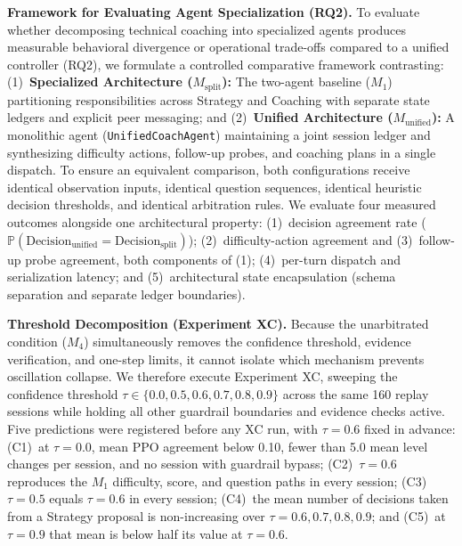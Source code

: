 \noindent\textbf{Framework for Evaluating Agent Specialization (RQ2).}
To evaluate whether decomposing technical coaching into specialized agents produces measurable behavioral divergence or operational trade-offs compared to a unified controller (RQ2), we formulate a controlled comparative framework contrasting: (1)~\textbf{Specialized Architecture ($M_{\text{split}}$):} The two-agent baseline ($M_1$) partitioning responsibilities across Strategy and Coaching with separate state ledgers and explicit peer messaging; and (2)~\textbf{Unified Architecture ($M_{\text{unified}}$):} A monolithic agent (\texttt{UnifiedCoachAgent}) maintaining a joint session ledger and synthesizing difficulty actions, follow-up probes, and coaching plans in a single dispatch. To ensure an equivalent comparison, both configurations receive identical observation inputs, identical question sequences, identical heuristic decision thresholds, and identical arbitration rules. We evaluate four measured outcomes alongside one architectural property: (1)~decision agreement rate ($\mathbb{P}(\text{Decision}_{\text{unified}} = \text{Decision}_{\text{split}})$); (2)~difficulty-action agreement and (3)~follow-up probe agreement, both components of (1); (4)~per-turn dispatch and serialization latency; and (5)~architectural state encapsulation (schema separation and separate ledger boundaries).

\noindent\textbf{Threshold Decomposition (Experiment XC).}
Because the unarbitrated condition ($M_4$) simultaneously removes the confidence threshold, evidence verification, and one-step limits, it cannot isolate which mechanism prevents oscillation collapse. We therefore execute Experiment XC, sweeping the confidence threshold $\tau \in \{0.0, 0.5, 0.6, 0.7, 0.8, 0.9\}$ across the same 160 replay sessions while holding all other guardrail boundaries and evidence checks active. Five predictions were registered before any XC run, with $\tau = 0.6$ fixed in advance: (C1)~at $\tau = 0.0$, mean PPO agreement below 0.10, fewer than 5.0 mean level changes per session, and no session with guardrail bypass; (C2)~$\tau = 0.6$ reproduces the $M_1$ difficulty, score, and question paths in every session; (C3)~$\tau = 0.5$ equals $\tau = 0.6$ in every session; (C4)~the mean number of decisions taken from a Strategy proposal is non-increasing over $\tau = 0.6, 0.7, 0.8, 0.9$; and (C5)~at $\tau = 0.9$ that mean is below half its value at $\tau = 0.6$.

